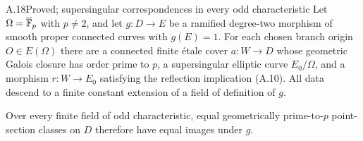 \begin{claim}{A.18}{Proved; supersingular correspondences in every odd characteristic}
Let $\Omega=\overline{\mathbb F}_p$ with $p\ne2$, and let
$g:D\to E$ be a ramified degree-two morphism of smooth proper
connected curves with $g(E)=1$. For each chosen branch origin
$O\in E(\Omega)$ there are a connected finite \'etale cover
$a:W\to D$ whose geometric Galois closure has order prime
to $p$, a supersingular elliptic curve $E_0/\Omega$, and a
morphism $r:W\to E_0$ satisfying the reflection implication
(A.10). All data descend to a finite constant extension of
a field of definition of $g$.

Over every finite field of odd characteristic, equal
geometrically prime-to-$p$ point-section classes on $D$
therefore have equal images under $g$.
\end{claim}
